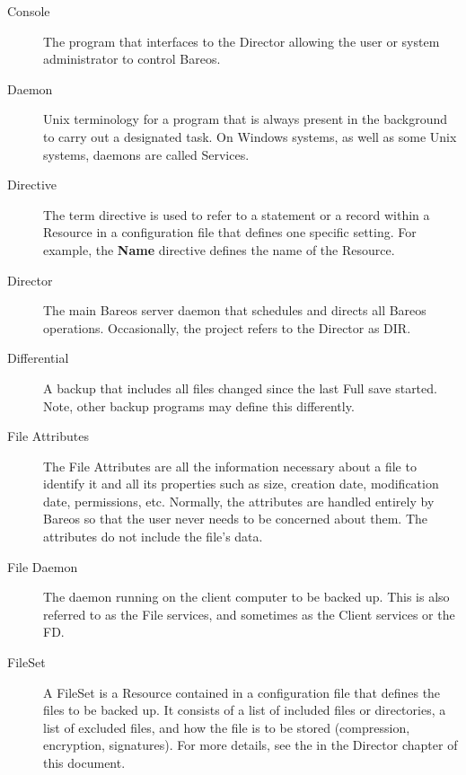 \begin{description}
\item [Console]
   The program that interfaces to the Director allowing  the user or system
   administrator to control Bareos.

\item [Daemon]
   Unix terminology for a program that is always present in  the background to
   carry out a designated task. On Windows systems, as well as some Unix
   systems, daemons are called Services.

\item [Directive]
   The term directive is used to refer to a statement or a record within a
   Resource in a configuration file that defines one specific setting.  For
   example, the {\bf Name} directive defines the name of the Resource.

\item [Director]
   The main Bareos server daemon that schedules and directs all  Bareos
   operations. Occasionally, the project refers to the Director as DIR.

\item [Differential]
   A backup that includes all files changed since the last  Full save started.
   Note, other backup programs may define this differently.

\item [File Attributes]
   The File Attributes are all the information  necessary about a file to
   identify it and all its properties such as  size, creation date, modification
   date, permissions, etc. Normally, the  attributes are handled entirely by
   Bareos so that the user never  needs to be concerned about them. The
   attributes do not include the  file's data.

\item [File Daemon]
   The daemon running on the client  computer to be backed up. This is also
   referred to as the File  services, and sometimes as the Client services or the
   FD.

\label{FileSetDef}
\item [FileSet]
   A FileSet is a Resource contained in a configuration file that defines
   the files to be backed up.  It consists of a list of included files or
   directories, a list of excluded files, and how the file is to be stored
   (compression, encryption, signatures).  For more details, see the
    in the Director
   chapter of this document.


\end{description}
